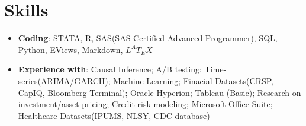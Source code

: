 \documentclass{resume}
\begin{document}

\section{Skills}
\begin{itemize}[parsep=0.25ex]
  \item \textbf{Coding}:
    STATA, R, SAS(\href{https://www.youracclaim.com/badges/c4bce10e-7398-4203-9d11-f9c6723749a4/linked_in_profile}{SAS Certified Advanced Programmer}), SQL, Python, EViews, Markdown, $L^{A}T_{E}X$

  \item \textbf{Experience with}:
   Causal Inference; A/B testing; Time-series(ARIMA/GARCH); Machine Learning; Finacial Datasets(CRSP, CapIQ, Bloomberg Terminal); Oracle Hyperion; Tableau (Basic); Research on investment/asset pricing; Credit risk modeling; Microsoft Office Suite; Healthcare Datasets(IPUMS, NLSY, CDC database)
   

 
  
\end{itemize}

\end{document}
